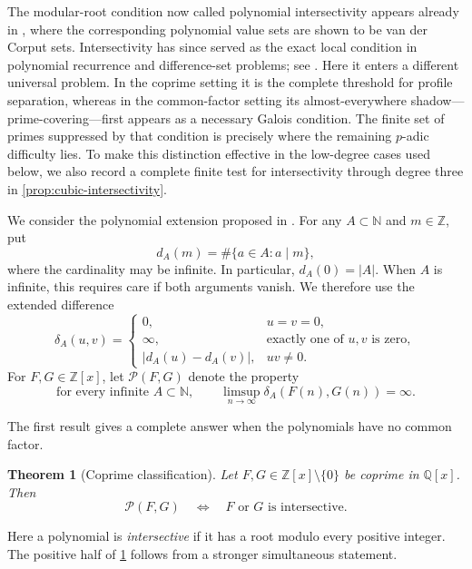 \documentclass[11pt]{amsart}
\newcommand{\N}{\mathbb N}
\newcommand{\Z}{\mathbb Z}
\newcommand{\Q}{\mathbb Q}
\newcommand{\cP}{\mathcal P}
\newtheorem{theorem}{Theorem}[section]
\theoremstyle{definition}
\begin{document}
The modular-root condition now called polynomial intersectivity appears
already in \cite[p.~335, item~(2)]{KamaeMendesFrance}, where the corresponding
polynomial value sets are shown to be van der Corput sets.  Intersectivity
has since served as the exact local condition in polynomial recurrence and
difference-set problems; see
\cite{Lucier2006,BergelsonLeibmanLesigne,Le2010}.
Here it enters a different universal problem.  In the coprime setting it is
the complete threshold for profile separation, whereas in the common-factor
setting its almost-everywhere shadow---prime-covering---first appears as a
necessary Galois condition.  The finite set of primes suppressed by that
condition is precisely where the remaining \(p\)-adic difficulty lies.  To
make this distinction effective in the low-degree cases used below, we also
record a complete finite test for intersectivity through degree three in
\cref{prop:cubic-intersectivity}.

We consider the polynomial extension proposed in
\cite[Problem 3]{DingLinear}.  For any \(A\subset\N\) and \(m\in\Z\), put
\[
  d_A(m)=\#\{a\in A:a\mid m\},
\]
where the cardinality may be infinite.  In particular, \(d_A(0)=|A|\).
When \(A\) is infinite, this requires care if both arguments vanish.  We
therefore use the extended difference
\begin{equation}\label{eq:extended-difference}
  \delta_A(u,v)=
  \begin{cases}
    0,&u=v=0,\\
    \infty,&\text{exactly one of \(u,v\) is zero},\\
    |d_A(u)-d_A(v)|,&uv\ne0.
  \end{cases}
\end{equation}
For \(F,G\in\Z[x]\), let \(\cP(F,G)\) denote the property
\begin{equation}\label{eq:property-P}
  \text{for every infinite \(A\subset\N\)},\qquad
  \limsup_{n\to\infty}\delta_A(F(n),G(n))=\infty.
\end{equation}

The first result gives a complete answer when the polynomials have no common
factor.

\begin{theorem}[Coprime classification]\label{thm:coprime-classification}
Let \(F,G\in\Z[x]\setminus\{0\}\) be coprime in \(\Q[x]\).  Then
\[
  \cP(F,G)
  \quad\Longleftrightarrow\quad
  \text{\(F\) or \(G\) is intersective}.
\]
\end{theorem}

Here a polynomial is \emph{intersective} if it has a root modulo every
positive integer.  The positive half of
\cref{thm:coprime-classification} follows from a stronger simultaneous
statement.
\end{document}
